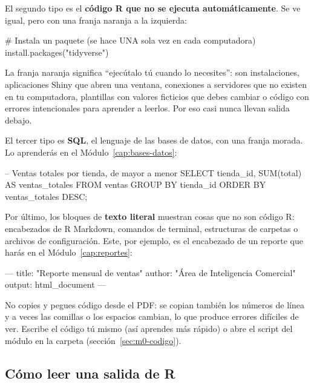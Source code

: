 El segundo tipo es el \textbf{código R que no se ejecuta automáticamente}.
Se ve igual, pero con una franja naranja a la izquierda:

\begin{rnoejecutar}
# Instala un paquete (se hace UNA sola vez en cada computadora)
install.packages("tidyverse")
\end{rnoejecutar}

La franja naranja significa ``ejecútalo tú cuando lo necesites'': son
instalaciones, aplicaciones Shiny que abren una ventana, conexiones a
servidores que no existen en tu computadora, plantillas con valores
ficticios que debes cambiar o código con errores intencionales para
aprender a leerlos. Por eso casi nunca llevan salida debajo.

El tercer tipo es \textbf{SQL}, el lenguaje de las bases de datos, con una
franja morada. Lo aprenderás en el Módulo~\ref{cap:bases-datos}:

\begin{sqlcode}
-- Ventas totales por tienda, de mayor a menor
SELECT tienda_id, SUM(total) AS ventas_totales
FROM ventas
GROUP BY tienda_id
ORDER BY ventas_totales DESC;
\end{sqlcode}

Por último, los bloques de \textbf{texto literal} muestran cosas que no son
código R: encabezados de R Markdown, comandos de terminal, estructuras de
carpetas o archivos de configuración. Este, por ejemplo, es el encabezado
de un reporte que harás en el Módulo~\ref{cap:reportes}:

\begin{textocodigo}
---
title: "Reporte mensual de ventas"
author: "Área de Inteligencia Comercial"
output: html_document
---
\end{textocodigo}

\begin{advertencia}
No copies y pegues código desde el PDF: se copian también los números de
línea y a veces las comillas o los espacios cambian, lo que produce errores
difíciles de ver. Escribe el código tú mismo (así aprendes más rápido) o
abre el script del módulo en la carpeta 
(sección~\ref{sec:m0-codigo}).
\end{advertencia}

\subsection{Cómo leer una salida de R}
\label{sec:m0-leer-salida}

